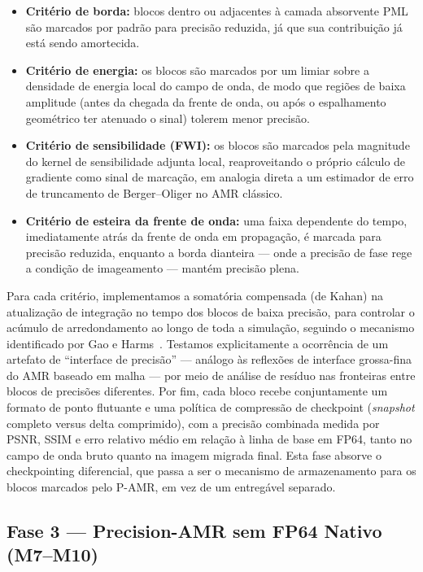 \documentclass[12pt,a4paper]{article}
\newcommand{\pamr}{P\nobreakdash-AMR}
\begin{document}
\begin{itemize}
  \item \textbf{Critério de borda:} blocos dentro ou adjacentes à camada
        absorvente PML são marcados por padrão para precisão reduzida, já que
        sua contribuição já está sendo amortecida.
  \item \textbf{Critério de energia:} os blocos são marcados por um limiar
        sobre a densidade de energia local do campo de onda, de modo que
        regiões de baixa amplitude (antes da chegada da frente de onda, ou
        após o espalhamento geométrico ter atenuado o sinal) tolerem menor
        precisão.
  \item \textbf{Critério de sensibilidade (FWI):} os blocos são marcados pela
        magnitude do kernel de sensibilidade adjunta local, reaproveitando o
        próprio cálculo de gradiente como sinal de marcação, em analogia
        direta a um estimador de erro de truncamento de Berger--Oliger no
        AMR clássico.
  \item \textbf{Critério de esteira da frente de onda:} uma faixa dependente
        do tempo, imediatamente atrás da frente de onda em propagação, é
        marcada para precisão reduzida, enquanto a borda dianteira --- onde a
        precisão de fase rege a condição de imageamento --- mantém precisão
        plena.
\end{itemize}

Para cada critério, implementamos a somatória compensada (de Kahan) na
atualização de integração no tempo dos blocos de baixa precisão, para
controlar o acúmulo de arredondamento ao longo de toda a simulação, seguindo o
mecanismo identificado por Gao e Harms~\cite{gao2023half}. Testamos
explicitamente a ocorrência de um artefato de ``interface de precisão'' ---
análogo às reflexões de interface grossa-fina do AMR baseado em malha --- por
meio de análise de resíduo nas fronteiras entre blocos de precisões
diferentes. Por fim, cada bloco recebe conjuntamente um formato de ponto
flutuante e uma política de compressão de checkpoint (\emph{snapshot}
completo versus delta comprimido), com a precisão combinada medida por PSNR,
SSIM e erro relativo médio em relação à linha de base em FP64, tanto no campo
de onda bruto quanto na imagem migrada final. Esta fase absorve o
checkpointing diferencial, que passa a ser o mecanismo de armazenamento para os
blocos marcados pelo \pamr{}, em vez de um entregável separado.

\subsection{Fase 3 --- Precision-AMR sem FP64 Nativo (M7--M10)}
\end{document}
